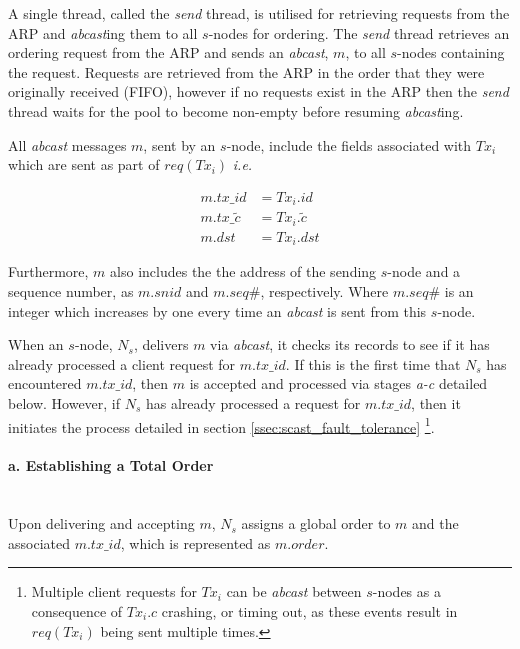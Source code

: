 \begin{enumerate}
        A single thread, called the \emph{send} thread, is utilised for retrieving requests from the ARP and \emph{abcast}ing them to all $s$-nodes for ordering.  The \emph{send} thread retrieves an ordering request from the ARP and sends an \emph{abcast}, $m$, to all $s$-nodes containing the request.  Requests are retrieved from the ARP in the order that they were originally received (FIFO), however if no requests exist in the ARP then the \emph{send} thread waits for the pool to become non-empty before resuming \emph{abcast}ing.  
		
		All \emph{abcast} messages $m$, sent by an $s$-node, include the fields associated with $Tx_i$ which are sent as part of $req(Tx_i)$ \emph{i.e.}
		
		\begin{equation*}
			\begin{split}
			    m.tx\_id &= Tx_i.id \\
			    m.tx\_\tilde{c} &= Tx_i.\tilde{c} \\
	           m.dst &= Tx_i.dst
	        \end{split}
		\end{equation*}
		
		Furthermore, $m$ also includes the the address of the sending $s$-node and a sequence number, as $m.snid$ and $m.seq\#$, respectively.  Where $m.seq\#$ is an integer which increases by one every time an \emph{abcast} is sent from this $s$-node.  
		
		When an $s$-node, $N_s$, delivers $m$ via \emph{abcast}, it checks its records to see if it has already processed a client request for $m.tx\_id$.  If this is the first time that $N_s$ has encountered $m.tx\_id$, then $m$ is accepted and processed via stages \emph{a-c} detailed below.  However, if $N_s$ has already processed a request for $m.tx\_id$, then it initiates the process detailed in section \ref{ssec:scast_fault_tolerance} \footnote{Multiple client requests for $Tx_i$ can be \emph{abcast} between $s$-nodes as a consequence of $Tx_i.c$ crashing, or timing out, as these events result in $req(Tx_i)$ being sent multiple times.}.  
		
        \paragraph{a. Establishing a Total Order} \hfill \\
		Upon delivering and accepting $m$, $N_s$ assigns a global order to $m$ and the associated $m.tx\_id$, which is represented as $m.order$.  
        

\end{enumerate}

